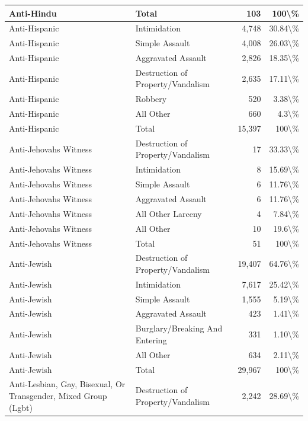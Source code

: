 \documentclass[
]{krantz}
\begin{document}
\begin{longtable}[t]{l|l|r|r}
\hline
Anti-Hindu & Total & 103 & 100\textbackslash{}\%\\
\hline
Anti-Hispanic & Intimidation & 4,748 & 30.84\textbackslash{}\%\\
\hline
Anti-Hispanic & Simple Assault & 4,008 & 26.03\textbackslash{}\%\\
\hline
Anti-Hispanic & Aggravated Assault & 2,826 & 18.35\textbackslash{}\%\\
\hline
Anti-Hispanic & Destruction of Property/Vandalism & 2,635 & 17.11\textbackslash{}\%\\
\hline
Anti-Hispanic & Robbery & 520 & 3.38\textbackslash{}\%\\
\hline
Anti-Hispanic & All Other & 660 & 4.3\textbackslash{}\%\\
\hline
Anti-Hispanic & Total & 15,397 & 100\textbackslash{}\%\\
\hline
Anti-Jehovahs Witness & Destruction of Property/Vandalism & 17 & 33.33\textbackslash{}\%\\
\hline
Anti-Jehovahs Witness & Intimidation & 8 & 15.69\textbackslash{}\%\\
\hline
Anti-Jehovahs Witness & Simple Assault & 6 & 11.76\textbackslash{}\%\\
\hline
Anti-Jehovahs Witness & Aggravated Assault & 6 & 11.76\textbackslash{}\%\\
\hline
Anti-Jehovahs Witness & All Other Larceny & 4 & 7.84\textbackslash{}\%\\
\hline
Anti-Jehovahs Witness & All Other & 10 & 19.6\textbackslash{}\%\\
\hline
Anti-Jehovahs Witness & Total & 51 & 100\textbackslash{}\%\\
\hline
Anti-Jewish & Destruction of Property/Vandalism & 19,407 & 64.76\textbackslash{}\%\\
\hline
Anti-Jewish & Intimidation & 7,617 & 25.42\textbackslash{}\%\\
\hline
Anti-Jewish & Simple Assault & 1,555 & 5.19\textbackslash{}\%\\
\hline
Anti-Jewish & Aggravated Assault & 423 & 1.41\textbackslash{}\%\\
\hline
Anti-Jewish & Burglary/Breaking And Entering & 331 & 1.10\textbackslash{}\%\\
\hline
Anti-Jewish & All Other & 634 & 2.11\textbackslash{}\%\\
\hline
Anti-Jewish & Total & 29,967 & 100\textbackslash{}\%\\
\hline
Anti-Lesbian, Gay, Bisexual, Or Transgender, Mixed Group (Lgbt) & Destruction of Property/Vandalism & 2,242 & 28.69\textbackslash{}\%\\

\end{longtable}
\end{document}
